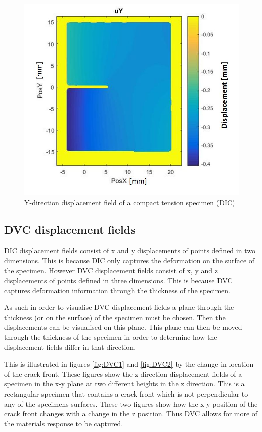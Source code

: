 \begin{figure}[h]
    \centering
    \includegraphics[scale=0.4]{DICuy}
    \caption{Y-direction displacement field of a compact tension specimen (DIC)}
    \label{fig:DICUY}
\end{figure}

\subsection{DVC displacement fields}
DIC displacement fields consist of x and y displacements of points defined in two dimensions. This is because DIC only captures the deformation on the surface of the specimen. However DVC displacement fields consist of x, y and z displacements of points defined in three dimensions. This is because DVC captures deformation information through the thickness of the specimen.

As such in order to visualise DVC displacement fields a plane through the thickness (or on the surface) of the specimen must be chosen. Then the displacements can be visualised on this plane. This plane can then be moved through the thickness of the specimen in order to determine how the displacement fields differ in that direction. 

This is illustrated in figures \ref{fig:DVC1} and \ref{fig:DVC2} by the change in location of the crack front. These figures show the z direction displacement fields of a specimen in the x-y plane at two different heights in the z direction. This is a rectangular specimen that contains a crack front which is not perpendicular to any of the specimens surfaces. These two figures show how the x-y position of the crack front changes with a change in the z position. Thus DVC allows for more of the materials response to be captured.

